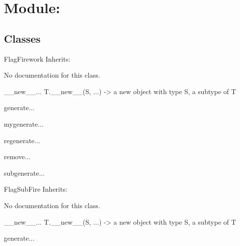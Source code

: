 \section{Module: }
\subsection{Classes}
\begin{classdesc*}{FlagFirework}
Inherits:

No documentation for this class.

\begin{methoddesc}{__new__}{...}
T.\_\_new\_\_(S, ...) -> a new object with type S, a subtype of T
\end{methoddesc}

\begin{methoddesc}{generate}{...}
\end{methoddesc}

\begin{methoddesc}{mygenerate}{...}
\end{methoddesc}

\begin{methoddesc}{regenerate}{...}
\end{methoddesc}

\begin{methoddesc}{remove}{...}
\end{methoddesc}

\begin{methoddesc}{subgenerate}{...}
\end{methoddesc}

\end{classdesc*}

\begin{classdesc*}{FlagSubFire}
Inherits:

No documentation for this class.

\begin{methoddesc}{__new__}{...}
T.\_\_new\_\_(S, ...) -> a new object with type S, a subtype of T
\end{methoddesc}

\begin{methoddesc}{generate}{...}
\end{methoddesc}

\end{classdesc*}

